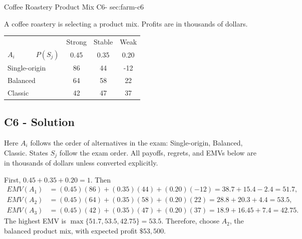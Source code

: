 \sectionScored
	{Coffee Roastery Product Mix}
	{C6-}
	{sec:farm-c6}
	{
	\label{sec:c6-exam-solutions}
	A coffee roastery is selecting a product mix. Profits are in thousands of dollars.
		\begin{center}\setlength{\tabcolsep}{2pt}\renewcommand{\arraystretch}{1.1}
			\begin{tabular}{lccc}\toprule
			&Strong&Stable&Weak\\
			$A_i \qquad \quad P(S_j)$&0.45&0.35&0.20\\ \midrule
			Single-origin&86&44&-12\\
			Balanced&64&58&22\\
			Classic&42&47&37\\ \bottomrule
			\end{tabular}
		\end{center}


	\label{subsec:farm-c6-solution}
	\subsection*{C6 - Solution }

	Here $A_i$ follows the order of alternatives in the exam: Single-origin, Balanced, Classic. States $S_j$ follow the exam order. All payoffs, regrets, and EMVs below are in thousands of dollars unless converted explicitly.

		First, $0.45+0.35+0.20=1$. Then
		\begin{align*}
EMV(A_1)&=(0.45)(86)+(0.35)(44)+(0.20)(-12)=38.7+15.4-2.4=51.7,\\
			EMV(A_2)&=(0.45)(64)+(0.35)(58)+(0.20)(22)=28.8+20.3+4.4=53.5,\\
			EMV(A_3)&=(0.45)(42)+(0.35)(47)+(0.20)(37)=18.9+16.45+7.4=42.75.
		\end{align*}
		The highest EMV is $\max\{51.7,53.5,42.75\}=53.5$. Therefore, choose $\boxed{A_2}$, the balanced product mix, with expected profit $\$53{,}500$.

	}

